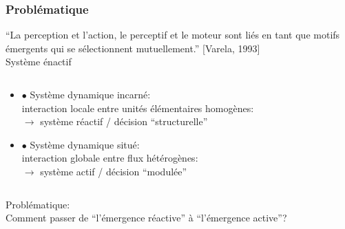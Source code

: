 \documentclass[10pt]{beamer}
\begin{document}
\begin{frame}
  \frametitle{Probl\'ematique}

``La {\color{blue}perception} et l'{\color{blue}action}, le perceptif et le moteur sont li\'es en tant que motifs {\color{red}\'emergents} qui se {\color{blue}s\'electionnent} mutuellement.'' [Varela, 1993]\\
 \vspace{1cm} \hspace{4cm}Syst\`eme {\color {myblue}\'enactif} \\
\begin{columns}
    \begin{column}{0.85\textwidth}
\begin {itemize}
\item[$\bullet$] Syst\`eme {\color {myblue}dynamique incarn\'e}:\\
 interaction {\color {blue}locale} entre unit\'es {\color {blue}\'el\'ementaires homog\`enes}:\\
$\to$ syst\`eme r\'eactif / d\'ecision ``structurelle''
\item[$\bullet$] Syst\`eme {\color {myblue}dynamique situ\'e}:\\
interaction {\color {blue}globale}  entre flux {\color {blue} h\'et\'erog\`enes}:\\
$\to$ syst\`eme actif / d\'ecision ``modul\'ee''
\end {itemize}  
\end{column}
    \begin{column}{0.4\textwidth}

\end{column}
\end{columns}

 \vspace{0.5cm}
{\color {blue} Probl\'ematique:}\\
Comment passer de {\color {red}``l'\'emergence r\'eactive''} \`a {\color {red}``l'\'emergence active''}?\\

\end{frame}
\end{document}
